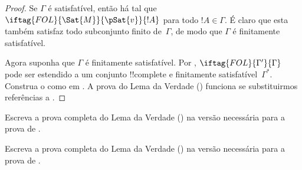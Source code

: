 \documentclass[../../../include/open-logic-section]{subfiles}
\begin{document}
\begin{proof}
Se $\Gamma$ é satisfatível, então há
tal que $\iftag{FOL}{\Sat{M}}{\pSat{v}}{!A}$ para todo $!A \in \Gamma$.
É claro que esta  também
satisfaz todo subconjunto finito de~$\Gamma$, de modo que $\Gamma$ é finitamente
satisfatível.

Agora suponha que $\Gamma$ é finitamente satisfatível. Por ,
$\iftag{FOL}{\Gamma'}{\Gamma}$ pode ser estendido a um conjunto !!{complete} e
finitamente satisfatível~$\Gamma^*$. Construa o 
como em .
A prova do Lema da Verdade () funciona se
substituirmos referências a .
\end{proof}

\begin{prob}
Escreva a prova completa do Lema da Verdade
() na versão necessária para a
prova de .
\end{prob}
\tagendprob

\begin{prob}
Escreva a prova completa do Lema da Verdade
() na versão necessária para a
prova de .
\end{prob}
\tagendprob
\end{document}

